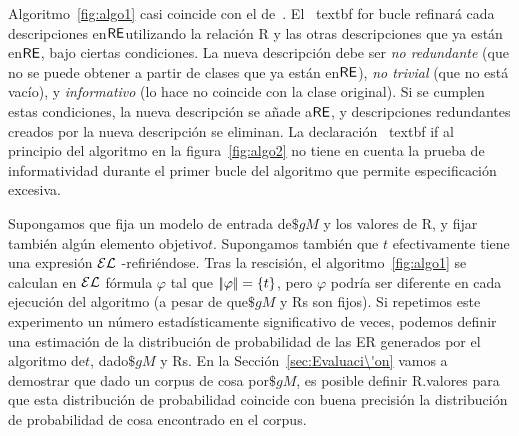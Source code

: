 Algoritmo~\ref{fig:algo1} casi coincide con el de~\cite{arec2:2008:Areces}. El \ textbf {for} bucle refinar\'a cada descripciones en$\textsf{RE}$utilizando la relaci\'on R y las otras descripciones que ya est\'an en$\textsf{RE} $, bajo ciertas condiciones. La nueva descripci\'on debe ser \emph{no redundante} (que no se puede obtener a partir de clases que ya est\'an en$\textsf{RE}$), \emph{no trivial} (que no est\'a vac\'{i}o), y \emph{informativo} (lo hace no coincide con la clase original). Si se cumplen estas condiciones, la nueva descripci\'on se a\~nade a$\textsf{RE} $, y descripciones redundantes creados por la nueva descripci\'on se eliminan. La declaraci\'on \ textbf {if} al principio del algoritmo en la figura~\ref{fig:algo2} no tiene en cuenta la prueba de informatividad durante el primer bucle del algoritmo que permite especificaci\'on excesiva.

Supongamos que fija un modelo de entrada de$\$gM$ y los valores de R, y fijar tambi\'en alg\'un elemento objetivo$t $. Supongamos tambi\'en que $t$ efectivamente tiene una expresi\'on $\mathcal{EL}$ -refiri\'endose. Tras la rescisi\'on, el algoritmo~\ref{fig:algo1} se calculan en $\mathcal{EL}$ f\'ormula $\varphi$ tal que $|\!|\varphi|\!| = \{t\}$, pero $\varphi$ podr\'{i}a ser diferente en cada ejecuci\'on del algoritmo (a pesar de que$\$gM$ y Rs son fijos). Si repetimos este experimento un n\'umero estad\'{i}sticamente significativo de veces, podemos definir una estimaci\'on de la distribuci\'on de probabilidad de las ER generados por el algoritmo de$t $, dado$\$gM$ y Rs. En la Secci\'on~\ref{sec:Evaluaci\'on} vamos a demostrar que dado un corpus de cosa por$\$gM$, es posible definir R.\puse valores para que esta distribuci\'on de probabilidad coincide con buena precisi\'on la distribuci\'on de probabilidad de cosa encontrado en el corpus.



